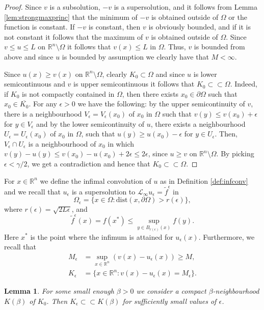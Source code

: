 \documentclass[11pt]{article}
\newcommand{\R}{\mathbb{R}}
\newcommand{\dist}{\mathrm{dist}}
\providecommand{\Linf}{\mathcal{L}_{\infty}}
\providecommand{\Rn}{\mathbb{R}^n}
\newcommand{\ol}{\overline}
\newtheorem{lem}[thm]{Lemma}
\numberwithin{equation}{section}
\theoremstyle{definition}
\begin{document}
\begin{proof}
 Since $v$ is a subsolution, $-v$ is a supersolution, and it follows from Lemma \ref{lem:strongmaxprinc} that the minimum of $-v$ is obtained outside of $\Omega$ or the function is constant. If $-v$ is constant, then $v$ is obviously bounded, and if it is not constant it follows that the maximum of $v$ is obtained outside of $\Omega$. Since $v \leq u \leq L$ on $\Rn \setminus \Omega$ it follows that $v(x) \leq L$ in $\Omega$. Thus, $v$ is bounded from above and since $u$ is bounded by assumption we clearly have that $M < \infty$.

Since $u(x) \geq v(x)$ on $\Rn \setminus \Omega$, clearly $K_0 \subset \Omega$ and since $u$ is lower semicontinuous and $v$ is upper semicontinuous it follows that $K_0 \subset \subset \Omega$. Indeed, if $K_0$ is not compactly contained in $\Omega$, then there exists $x_0 \in \partial \Omega$ such that $x_0 \in \ol{K_0}$. For any $\epsilon > 0$ we have the following: by the upper semicontinuity of $v$, there is a neighbourhood $V_\epsilon = V_\epsilon(x_0)$ of $x_0$ in $\Omega$ such that $v(y) \leq v(x_0) + \epsilon$ for $y \in V_\epsilon$ and by the lower semicontinuity of $u$, there exists a neighbourhood $U_\epsilon = U_\epsilon(x_0)$ of $x_0$ in $\Omega$, such that $u(y) \geq u(x_0) - \epsilon$ for $y \in U_\epsilon$. Then, $V_\epsilon \cap U_\epsilon$ is a neighbourhood of $x_0$ in which $v(y) - u(y) \leq v(x_0) - u(x_0) + 2\epsilon \leq 2\epsilon$, since $u \geq v$ on $\R^n \setminus \Omega$. By picking $\epsilon < \gamma /2$, we get a contradiction and hence that $K_0 \subset \subset \Omega$. 
\end{proof}
For $x \in \Rn$ we define the infimal convolution of $u$ as in Definition \ref{def:infconv} and we recall that $u_{\epsilon}$ is a supersolution to $\Linf u_{\epsilon} =  \tilde{f}^{\epsilon}$ in 
$$
\Omega_{\epsilon} = \{x \in \Omega:\dist(x, \partial \Omega) > r(\epsilon) \},
$$
where $r(\epsilon) = \sqrt{2L\epsilon}$, and 
$$
 \tilde{f}^{\epsilon}(x) =  f(x^*) \leq \sup_{y \in B_{r(\epsilon)}(x)} f(y).
$$
Here $x^*$ is the point where the infimum is attained for $u_{\epsilon}(x)$. Furthermore, we recall that
\begin{align*}
    M_{\epsilon} &= \sup_{x \in \Rn}(v(x)-u_{\epsilon}(x)) \geq M, \\
    K_{\epsilon} &= \{x \in \Rn  :v(x)-u_{\epsilon}(x) = M_{\epsilon} \}.
\end{align*}
\begin{lem}\label{lem:A2}
      For some small enough $\beta>0$ we consider a compact $\beta$-neighbourhood $K(\beta)$ of $K_0$. Then $K_{\epsilon} \subset \subset K(\beta)$ for sufficiently small values of $\epsilon$.
\end{lem}
\end{document}
